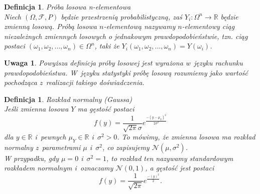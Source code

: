 \documentclass[12pt,a4paper]{report}
\newtheorem{definition}[theorem]{Definicja}
\newtheorem{uwaga}{Uwaga}
\begin{document}
\begin{definition}{Próba losowa n-elementowa \cite[Rozdział 2]{bartoszewicz1996}}\\
Niech $(\Omega, \mathcal{F}, P)$ będzie przestrzenią probabilistyczną, zaś $Y_{i}:\Omega^{n}  \rightarrow \mathbb{R}$ będzie zmienną losową.  
Próbą losowa $n$-elementową nazywamy $n$-elementowy ciąg niezależnych zmiennych losowych o jednakowym prawdopodobieństwie, tzn. ciąg postaci $(\omega_{1}, \omega_{2}, \ldots, \omega_{n}) \in \Omega^{n}$, taki że $Y_{i}(\omega_{1}, \omega_{2}, \ldots, \omega_{n})=Y(\omega_{i})$.
\end{definition}


\begin{uwaga}
Powyższa definicja próby losowej jest wyrażona w~języku rachunku prawdopodobieństwa. W~języku statystyki próbę losową rozumiemy jako wartość pochodząca z~realizacji takiego doświadczenia.
\end{uwaga}



\begin{definition}{Rozkład normalny (Gaussa) \cite[Rozdział 5.10]{jakubowski2004}}\\
Jeśli zmienna losowa $Y$ ma gęstość postaci
$$
f(y)=\frac{1}{\sqrt{2\pi}\sigma}e^\frac{-(y-\mu_Y)^2}{2\sigma^2}
$$ 
dla $y \in \mathbb{R}$ i~pewnych $\mu_Y \in \mathbb{R}$ i~$\sigma^2 >0$. To mówimy, że zmienna losowa ma rozkład normalny z~parametrami $\mu$ i~$\sigma^2$, co zapisujemy $\mathcal{N}(\mu, \sigma^2)$.\\
W przypadku, gdy $\mu=0$ i~$\sigma^2=1$, to rozkład ten nazywamy standardowym rozkładem normalnym i~oznaczamy $\mathcal{N}(0,1)$, a gęstość jest postaci
$$f(y)=\frac{1}{\sqrt{2\pi}}e^\frac{-(y)^2}{2}.$$ 
\end{definition}


\end{document}
